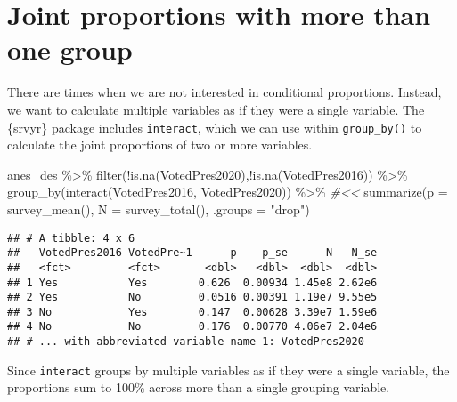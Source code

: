 \documentclass[
]{krantz}
\makeatletter
\newenvironment{Shaded}{\begin{snugshade}}{\end{snugshade}}
\newcommand{\AttributeTok}[1]{\textcolor[rgb]{0.61,0.61,0.61}{#1}}
\newcommand{\CommentTok}[1]{\textcolor[rgb]{0.37,0.37,0.37}{\textit{#1}}}
\newcommand{\FunctionTok}[1]{\textcolor[rgb]{0,0,0}{#1}}
\newcommand{\NormalTok}[1]{#1}
\newcommand{\SpecialCharTok}[1]{\textcolor[rgb]{0,0,0}{#1}}
\newcommand{\StringTok}[1]{\textcolor[rgb]{0.5,0.5,0.5}{#1}}
\newenvironment{kframe}{%
\medskip{}
\setlength{\fboxsep}{.8em}
 \def\at@end@of@kframe{}%
 \ifinner\ifhmode%
  \def\at@end@of@kframe{\end{minipage}}%
  \begin{minipage}{\columnwidth}%
 \fi\fi%
 \def\FrameCommand##1{\hskip\@totalleftmargin \hskip-\fboxsep
 \colorbox{shadecolor}{##1}\hskip-\fboxsep
     \hskip-\linewidth \hskip-\@totalleftmargin \hskip\columnwidth}%
 \MakeFramed {\advance\hsize-\width
   \@totalleftmargin\z@ \linewidth\hsize
   \@setminipage}}%
 {\par\unskip\endMakeFramed%
 \at@end@of@kframe}
\renewenvironment{Shaded}{\begin{kframe}}{\end{kframe}}
\makeatother
\begin{document}
\hypertarget{joint-proportions-with-more-than-one-group}{%
\section{Joint proportions with more than one group}\label{joint-proportions-with-more-than-one-group}}

There are times when we are not interested in conditional proportions. Instead, we want to calculate multiple variables as if they were a single variable. The \{srvyr\} package includes \texttt{interact}, which we can use within \texttt{group\_by()} to calculate the joint proportions of two or more variables.

\begin{Shaded}
\begin{Highlighting}[]
\NormalTok{anes\_des }\SpecialCharTok{\%\textgreater{}\%}
  \FunctionTok{filter}\NormalTok{(}\SpecialCharTok{!}\FunctionTok{is.na}\NormalTok{(VotedPres2020),}\SpecialCharTok{!}\FunctionTok{is.na}\NormalTok{(VotedPres2016)) }\SpecialCharTok{\%\textgreater{}\%}
  \FunctionTok{group\_by}\NormalTok{(}\FunctionTok{interact}\NormalTok{(VotedPres2016, VotedPres2020)) }\SpecialCharTok{\%\textgreater{}\%} \CommentTok{\#\textless{}\textless{}}
  \FunctionTok{summarize}\NormalTok{(}\AttributeTok{p =} \FunctionTok{survey\_mean}\NormalTok{(),}
            \AttributeTok{N =} \FunctionTok{survey\_total}\NormalTok{(),}
            \AttributeTok{.groups =} \StringTok{"drop"}\NormalTok{)}
\end{Highlighting}
\end{Shaded}

\begin{verbatim}
## # A tibble: 4 x 6
##   VotedPres2016 VotedPre~1      p    p_se      N   N_se
##   <fct>         <fct>       <dbl>   <dbl>  <dbl>  <dbl>
## 1 Yes           Yes        0.626  0.00934 1.45e8 2.62e6
## 2 Yes           No         0.0516 0.00391 1.19e7 9.55e5
## 3 No            Yes        0.147  0.00628 3.39e7 1.59e6
## 4 No            No         0.176  0.00770 4.06e7 2.04e6
## # ... with abbreviated variable name 1: VotedPres2020
\end{verbatim}

Since \texttt{interact} groups by multiple variables as if they were a single variable, the proportions sum to 100\% across more than a single grouping variable.
\end{document}
